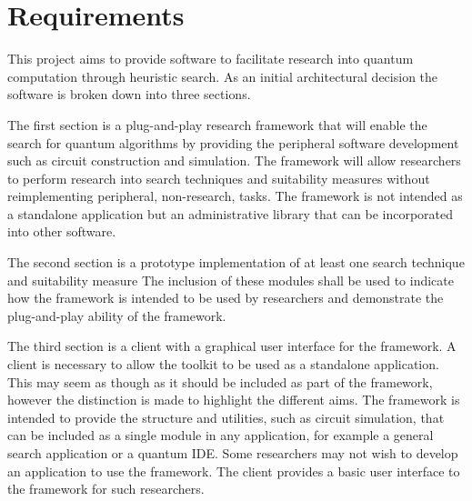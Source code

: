 \chapter{Requirements}
\label{sec:reqs}

This project aims to provide software to facilitate research into quantum computation through heuristic search.
As an initial architectural decision the software is broken down into three sections.

The first section is a plug-and-play research framework that will enable the search for quantum algorithms by providing the peripheral software development such as circuit construction and simulation.
The framework will allow researchers to perform research into search techniques and suitability measures without reimplementing peripheral, non-research, tasks.
The framework is not intended as a standalone application but an administrative library that can be incorporated into other software.

The second section is a prototype implementation of at least one search technique and suitability measure
The inclusion of these modules shall be used to indicate how the framework is intended to be used by researchers and demonstrate the plug-and-play ability of the framework.

The third section is a client with a graphical user interface for the framework.
A client is necessary to allow the toolkit to be used as a standalone application.
This may seem as though as it should be included as part of the framework, however the distinction is made to highlight the different aims.
The framework is intended to provide the structure and utilities, such as circuit simulation, that can be included as a single module in any application, for example a general search application or a quantum IDE.
Some researchers may not wish to develop an application to use the framework.
The client provides a basic user interface to the framework for such researchers.


